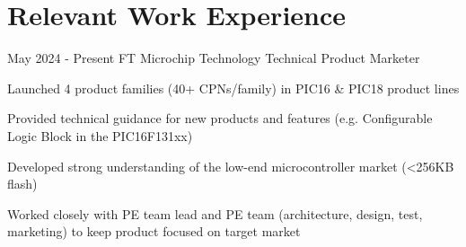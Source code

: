\documentclass[
	12pt, %
]{FreemanCV}
\begin{document}
\section{Relevant Work Experience}
\jobentry
	{May 2024 - Present} %
	{FT} %
	{Microchip Technology} %
	{Technical Product Marketer} %
	{ %
		\item Launched 4 product families (40+ CPNs/family) in PIC16 \& PIC18 product lines
		\item Provided technical guidance for new products and features (e.g. Configurable Logic Block in the PIC16F131xx)
		\item Developed strong understanding of the low-end microcontroller market (<256KB flash) %
		\item Worked closely with PE team lead and PE team (architecture, design, test, marketing) to keep product focused on target market
	} 
\end{document}
